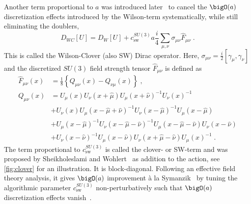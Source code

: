 Another term proportional to $a$ was introduced later~\cite{sw1985} to cancel the $\bigO(a)$ discretization effects introduced by the Wilson-term systematically, while still eliminating the doublers,
\begin{equation} \label{eq:dirac:wilson:clover}
D_{WC}[U] = D_W[U] + c_\mathrm{sw}^{SU(3)} a \frac{i}{4} \sum_{\mu, \nu} \sigma_{\mu \nu} \hat{F}_{\mu \nu} \;.
\end{equation}
This is called the Wilson-Clover (also SW) Dirac operator.
Here, $\sigma_{\mu \nu} = \frac{i}{2} \left[\gamma_{\mu}, \gamma_{\nu}\right]$ and the discretized $SU(3)$ field strength tensor $\hat{F}_{\mu \nu}$ is defined as
\begin{align}
\hat{F}_{\mu \nu}(x) &= \frac{1}{8} \left\{
    Q_{\mu \nu}(x) - Q_{\nu \mu}(x)
\right\} \;, \label{eq:intro:clover} \\
Q_{\mu \nu}(x)
&= U_{\mu}(x)
   U_{\nu}(x+\hat{\mu})
   U_{\mu}(x+\hat{\nu})^{-1}
   U_{\nu}(x)^{-1} \label{eq:intro:clover:p1} \\
&+ U_{\nu}(x)
   U_{\mu}(x-\hat{\mu}+\hat{\nu})^{-1}
   U_{\nu}(x-\hat{\mu})^{-1}
   U_{\mu}(x-\hat{\mu}) \label{eq:intro:clover:p2} \\
&+ U_{\mu}(x-\hat{\mu})^{-1}
   U_{\nu}(x-\hat{\mu}-\hat{\nu})^{-1}
   U_{\mu}(x-\hat{\mu}-\hat{\nu})
   U_{\nu}(x-\hat{\nu}) \label{eq:intro:clover:p3} \\
&+ U_{\nu}(x-\hat{\nu})^{-1}
   U_{\mu}(x-\hat{\nu})
   U_{\nu}(x+\hat{\mu}-\hat{\nu})
   U_{\mu}(x)^{-1} \;. \label{eq:intro:clover:p4}
\end{align}
The term proportional to $c_\mathrm{sw}^{SU(3)}$ is called the clover- or SW-term and was proposed by Sheikholeslami and Wohlert~\cite{sw1985} as addition to the action, see \cref{fig:clover} for an illustration.
It is block-diagonal.
Following an effective field theory analysis, it gives $\bigO(a)$ improvement à la Symanzik~\cite{symanzik1982,SYMANZIK1983} by tuning the algorithmic parameter $c_\mathrm{sw}^{SU(3)}$ non-perturbatively such that $\bigO(a)$ discretization effects vanish~\cite{LUSCHER1996365}.

